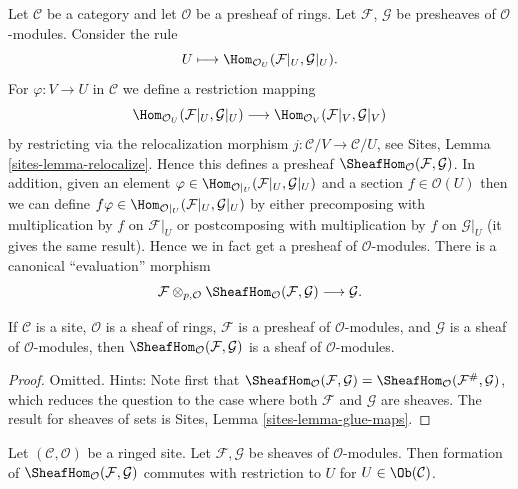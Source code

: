\noindent
Let $\mathcal{C}$ be a category and let $\mathcal{O}$ be a presheaf
of rings. Let $\mathcal{F}$, $\mathcal{G}$ be presheaves of
$\mathcal{O}$-modules. Consider the rule
$$
U \longmapsto \Hom_{\mathcal{O}_U}(\mathcal{F}|_U, \mathcal{G}|_U).
$$
For $\varphi : V \to U$ in $\mathcal{C}$ we define a restriction mapping
$$
\Hom_{\mathcal{O}_U}(\mathcal{F}|_U, \mathcal{G}|_U)
\longrightarrow
\Hom_{\mathcal{O}_V}(\mathcal{F}|_V, \mathcal{G}|_V)
$$
by restricting via the relocalization morphism
$j : \mathcal{C}/V \to \mathcal{C}/U$, see
Sites, Lemma \ref{sites-lemma-relocalize}. Hence this defines a
presheaf $\SheafHom_\mathcal{O}(\mathcal{F}, \mathcal{G})$.
In addition, given an element
$\varphi \in \Hom_{\mathcal{O}|_U}(\mathcal{F}|_U, \mathcal{G}|_U)$
and a section $f \in \mathcal{O}(U)$ then we can define
$f\varphi \in \Hom_{\mathcal{O}|_U}(\mathcal{F}|_U, \mathcal{G}|_U)$
by either precomposing with multiplication by $f$ on $\mathcal{F}|_U$
or postcomposing with multiplication by $f$ on $\mathcal{G}|_U$ (it gives
the same result). Hence we in fact get a presheaf of $\mathcal{O}$-modules.
There is a canonical ``evaluation'' morphism
$$
\mathcal{F}
\otimes_{p, \mathcal{O}}
\SheafHom_\mathcal{O}(\mathcal{F}, \mathcal{G})
\longrightarrow
\mathcal{G}.
$$

\begin{lemma}
\label{lemma-internal-hom}
If $\mathcal{C}$ is a site, $\mathcal{O}$ is a sheaf of rings,
$\mathcal{F}$ is a presheaf of $\mathcal{O}$-modules, and
$\mathcal{G}$ is a sheaf of $\mathcal{O}$-modules, then
$\SheafHom_\mathcal{O}(\mathcal{F}, \mathcal{G})$
is a sheaf of $\mathcal{O}$-modules.
\end{lemma}

\begin{proof}
Omitted. Hints: Note first that
$\SheafHom_\mathcal{O}(\mathcal{F}, \mathcal{G})
= \SheafHom_\mathcal{O}(\mathcal{F}^\#, \mathcal{G})$, which reduces
the question to the case where both $\mathcal{F}$ and $\mathcal{G}$
are sheaves. The result for sheaves of sets is
Sites, Lemma \ref{sites-lemma-glue-maps}.
\end{proof}

\begin{lemma}
\label{lemma-internal-hom-restriction}
Let $(\mathcal{C}, \mathcal{O})$ be a ringed site.
Let $\mathcal{F}, \mathcal{G}$ be sheaves of $\mathcal{O}$-modules.
Then formation of $\SheafHom_\mathcal{O}(\mathcal{F}, \mathcal{G})$
commutes with restriction to $U$ for $U \in \Ob(\mathcal{C})$.
\end{lemma}

